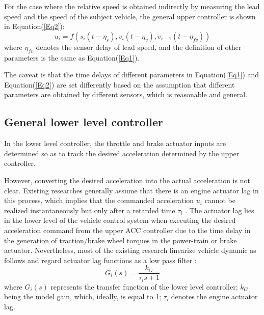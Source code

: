 \documentclass[journal]{IEEEtran}
\begin{document}
For the case where the relative speed is obtained indirectly by measuring the lead speed and the speed of the subject vehicle, the general upper controller is shown in Equation(\ref{Eq2}):
\begin{equation}
  u_i=f(s_i\left(t-\eta_s\right),v_i\left(t-\eta_v\right), v_{i-1}(t-\eta_{fv}))
  \label{Eq2}
\end{equation}
where $\eta_{fv}$ denotes the sensor delay of lead speed, and the definition of other parameters is the same as Equation(\ref{Eq1}).

The caveat is that the time delays of different parameters in Equation(\ref{Eq1}) and Equation(\ref{Eq2}) are set differently based on the assumption that different parameters are obtained by different sensors, which is reasonable and general.




\subsection{General lower level controller}
\label{Section 2.3}

In the lower level controller, the throttle and brake actuator inputs are determined so as to track the desired acceleration determined by the upper controller.

However, converting the desired acceleration into the actual acceleration is not clear. Existing researches generally assume that there is an engine actuator lag in this process, which implies that the commanded acceleration $u_i$ cannot be realized instantaneously but only after a retarded time $\tau_i$ \citep{Ploeg2011}. The actuator lag lies in the lower level of the vehicle control system when executing the desired acceleration command from the upper ACC controller due to the time delay in the generation of traction/brake wheel torques in the power-train or brake actuator. Nevertheless, most of the existing research linearize vehicle dynamic as follows and regard actuator lag functions as a low pass filter \citep{Wang2018a,Naus2010}:
\begin{equation}
  G_i(s)=\frac{k_G}{\tau_is+1}
  \label{Eq3}
\end{equation}
where $G_i(s)$ represents the transfer function of the lower level controller; $k_G$ being the model gain, which, ideally, is equal to 1; $\tau_i$ denotes the engine actuator lag.
\end{document}
